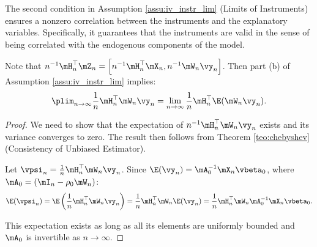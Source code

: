 \documentclass[english,12pt]{book}\usepackage[]{graphicx}\usepackage[]{xcolor}
\begin{document}
The second condition in Assumption \ref{assu:iv_instr_lim} (Limits of Instruments) ensures a nonzero correlation between the instruments and the explanatory variables. Specifically, it guarantees that the instruments are valid in the sense of being correlated with the endogenous components of the model.  

Note that $n^{-1}\mH_n^\top\mZ_n = \left[n^{-1}\mH_n^\top\mX_n, n^{-1}\mW_n\vy_n\right]$. Then part (b) of Assumption \ref{assu:iv_instr_lim} implies:
\begin{equation}\label{eq:implication-of-plimHQ}
\plim_{n\to\infty} \frac{1}{n}\mH_n^\top\mW_n\vy_n = \lim_{n\to \infty}\frac{1}{n}\mH_n^\top\E(\mW_n\vy_n). 
\end{equation}

\begin{proof}\label{proof:consistency-plimHQ}
We need to show that the expectation of $n^{-1}\mH_n^\top\mW_n\vy_n$ exists and its variance converges to zero. The result then follows from Theorem \ref{teo:chebyshev} (Consistency of Unbiased Estimator).

Let $\vpsi_n = \frac{1}{n}\mH_n^\top\mW_n\vy_n$. Since $\E(\vy_n) = \mA_0^{-1}\mX_n\vbeta_0$, where $\mA_0 = \left(\mI_n - \rho_0\mW_n\right)$:
\begin{equation*}
\E(\vpsi_n) =\E\left(\frac{1}{n}\mH_n^\top\mW_n\vy_n\right) = \frac{1}{n}\mH_n^\top\mW_n\E(\vy_n) = \frac{1}{n}\mH_n^\top\mW_n\mA_0^{-1}\mX_n\vbeta_0.
\end{equation*}

This expectation exists as long as all its elements are uniformly bounded and $\mA_0$ is invertible as $n\to\infty$. 


\end{proof}
\end{document}
